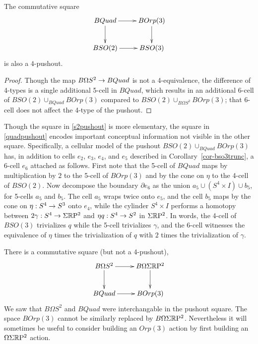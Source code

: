 \documentclass{amsart}
\begin{document}
\begin{corollary}
\label{quadpushout}
The commutative square
\[
\vcenter{\hbox{\xymatrix{
BQuad \ar[r] \ar[d] & BOrp(3) \ar[d] \\
BSO(2) \ar[r] & BSO(3)
}}}
\]
is also a $4$-pushout.
\end{corollary}
\begin{proof}
Though the map $B\Omega S^2 \rightarrow BQuad$ is not a 4-equivalence, the difference of 4-types is a single additional 5-cell in $BQuad$, which results in an additional 6-cell of $BSO(2) \cup_{BQuad} BOrp(3)$ compared to $BSO(2) \cup_{B\Omega S^2} BOrp(3)$; that 6-cell does not affect the 4-type of the pushout.
\end{proof}

\nid Though the square in \cref{s2pushout} is more elementary, the square in \cref{quadpushout} encodes important conceptual information not visible in the other square.  Specifically, a cellular model of the pushout $BSO(2) \cup_{BQuad} BOrp(3)$ has, in addition to cells $e_2$, $e_3$, $e_4$, and $e_5$ described in Corollary~\ref{cor-bso3trunc}, a 6-cell $e_6$ attached as follows.  First note that the 5-cell of $BQuad$ maps by multiplication by $2$ to the 5-cell of $BOrp(3)$ and by the cone on $\eta$ to the 4-cell of $BSO(2)$.  %
Now decompose the boundary $\partial e_6$ as the union $a_5 \cup (S^4 \times I) \cup b_5$, for 5-cells $a_5$ and $b_5$.  The cell $a_5$ wraps twice onto $e_5$, and the cell $b_5$ maps by the cone on $\eta: S^4 \rightarrow S^3$ onto $e_4$, while the cylinder $S^4 \times I$ performs a homotopy between $2 \gamma : S^4 \rightarrow \Sigma \mathbb R \mathrm{P}^2$ and $\eta q: S^4 \rightarrow S^2$ in $\Sigma \mathbb R \mathrm{P}^2$.  In words, the 4-cell of $BSO(3)$ trivializes $q$ while the 5-cell trivializes $\gamma$, and the 6-cell witnesses the equivalence of $\eta$ times the trivialization of $q$ with $2$ times the trivialization of $\gamma$.

\begin{remark}
There is a commutative square (but not a 4-pushout),
\[
\vcenter{\hbox{\xymatrix{
B\Omega S^2 \ar[r] \ar[d] & B\Omega \Sigma \RP^2 \ar[d] \\
BQuad \ar[r] & BOrp(3)
}}}
\]
We saw that $B\Omega S^2$ and $BQuad$ were interchangable in the pushout square.  The space $BOrp(3)$ cannot be similarly replaced by $B\Omega \Sigma \mathbb R \mathrm{P}^2$.  Nevertheless it will sometimes be useful to consider building an $Orp(3)$ action by first building an $\Omega \Sigma \mathbb R \mathrm{P}^2$ action.
\end{remark}
\end{document}
